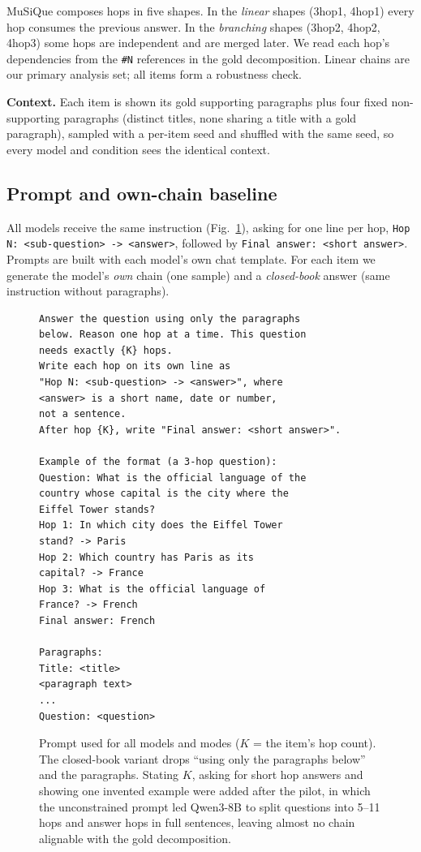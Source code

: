 \documentclass[conference]{IEEEtran}
\begin{document}
MuSiQue composes hops in five shapes. In the \emph{linear} shapes (3hop1, 4hop1) every hop consumes the previous answer. In the \emph{branching} shapes (3hop2, 4hop2, 4hop3) some hops are independent and are merged later. We read each hop's dependencies from the \texttt{\#N} references in the gold decomposition. Linear chains are our primary analysis set; all items form a robustness check.

\textbf{Context.} Each item is shown its gold supporting paragraphs plus four fixed non-supporting paragraphs (distinct titles, none sharing a title with a gold paragraph), sampled with a per-item seed and shuffled with the same seed, so every model and condition sees the identical context.

\subsection{Prompt and own-chain baseline}
All models receive the same instruction (Fig.~\ref{fig:prompt}), asking for one line per hop, \texttt{Hop N: <sub-question> -> <answer>}, followed by \texttt{Final answer: <short answer>}. Prompts are built with each model's own chat template. For each item we generate the model's \emph{own} chain (one sample) and a \emph{closed-book} answer (same instruction without paragraphs).

\begin{figure}[t]
\footnotesize
\begin{verbatim}
Answer the question using only the paragraphs
below. Reason one hop at a time. This question
needs exactly {K} hops.
Write each hop on its own line as
"Hop N: <sub-question> -> <answer>", where
<answer> is a short name, date or number,
not a sentence.
After hop {K}, write "Final answer: <short answer>".

Example of the format (a 3-hop question):
Question: What is the official language of the
country whose capital is the city where the
Eiffel Tower stands?
Hop 1: In which city does the Eiffel Tower
stand? -> Paris
Hop 2: Which country has Paris as its
capital? -> France
Hop 3: What is the official language of
France? -> French
Final answer: French

Paragraphs:
Title: <title>
<paragraph text>
...
Question: <question>
\end{verbatim}
\caption{Prompt used for all models and modes ($K$ = the item's hop count). The closed-book variant drops ``using only the paragraphs below'' and the paragraphs. Stating $K$, asking for short hop answers and showing one invented example were added after the pilot, in which the unconstrained prompt led Qwen3-8B to split questions into 5--11 hops and answer hops in full sentences, leaving almost no chain alignable with the gold decomposition.}
\label{fig:prompt}
\end{figure}
\end{document}
